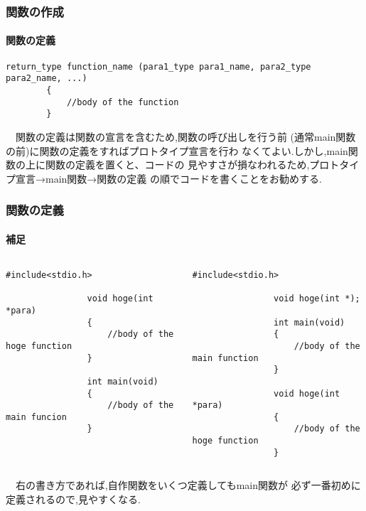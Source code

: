 \documentclass[dvipdfmx]{beamer}
\begin{document}
\begin{frame}[t, fragile, label=46]
	\frametitle{関数の作成}
	\framesubtitle{関数の定義}
	\begin{lstlisting}[gobble=8, caption=Syntax\space of\space function
        \space definition]
        return_type function_name (para1_type para1_name, para2_type para2_name, ...)
        {
            //body of the function
        }
    \end{lstlisting}
    　関数の定義は関数の宣言を含むため,関数の呼び出しを行う前
        (通常main関数の前)に関数の定義をすればプロトタイプ宣言を行わ
        なくてよい.しかし,main関数の上に関数の定義を置くと、コードの
        見やすさが損なわれるため,プロトタイプ宣言→main関数→関数の定義
        の順でコードを書くことをお勧めする.
    \vfill \hfill 
    \hyperlink{45}{}
    \space
    \hyperlink{47}{}
\end{frame}

\begin{frame}[t, fragile, label=47]
    \frametitle{関数の定義}
    \framesubtitle{補足}
    \vspace{-30pt}
    \begin{columns}[t, totalwidth=0.98\linewidth]
        \begin{column}{.45\linewidth}
            \begin{lstlisting}[gobble=16, caption=Example\_1]
                #include<stdio.h>
                
                void hoge(int *para)
                {
                    //body of the hoge function
                }

                int main(void)
                {   
                    //body of the main funcion
                }
            \end{lstlisting}
        \end{column}
        \begin{column}{.51\linewidth}
            \begin{lstlisting}[gobble=16, caption=Example\_2]
                #include<stdio.h>

                void hoge(int *);

                int main(void)
                {
                    //body of the main function
                }

                void hoge(int *para)
                {
                    //body of the hoge function
                }
            \end{lstlisting}
        \end{column}
    \end{columns}
    　右の書き方であれば,自作関数をいくつ定義してもmain関数が
    必ず一番初めに定義されるので,見やすくなる.
    \vfill \hfill 
    \hyperlink{46}{}
    \space
    \hyperlink{48}{}
\end{frame}
\end{document}
